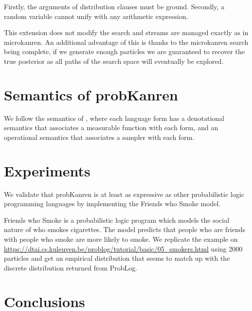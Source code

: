 \documentclass[
]{ceurart}
\begin{document}
Firstly, the arguments of distribution clauses must be
ground. Secondly, a random variable cannot unify with any arithmetic
expression.

This extension does not modify the search and streams are managed
exactly as in microkanren. An additional advantage of this is thanks
to the microkanren search being complete, if we generate enough
particles we are guaranteed to recover the true posterior as all paths
of the search space will eventually be explored.

\section{Semantics of probKanren}

We follow the semantics of \cite{staton2016semantics}, where each
language form has a denotational semantics that associates a
measurable function with each form, and an operational semantics that associates
a sampler with each form.

\section{Experiments}

We validate that probKanren is at least as expressive as other probabilistic
logic programming languages by implementing the Friends who Smoke model.

Friends who Smoke is a probabilistic logic program which models the
social nature of who smokes cigarettes. The model predicts that people
who are friends with people who smoke are more likely to smoke. We
replicate the example on
\url{https://dtai.cs.kuleuven.be/problog/tutorial/basic/05_smokers.html}
using 2000 particles and get an empirical distribution that seems to
match up with the discrete distribution returned from ProbLog.




\section{Conclusions}
\end{document}
